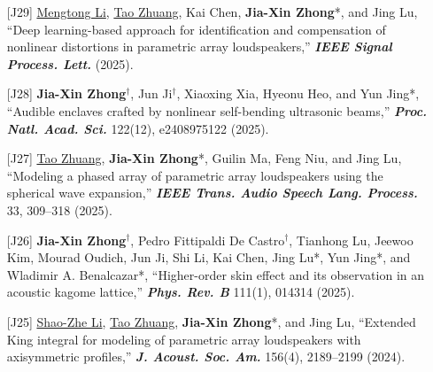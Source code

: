 \documentclass[10pt,a4paper,ragged2e,withhyper]{altacv}
\newcommand{\PubJournal}[1]{\textbf{\textit{#1}}}
\newcommand{\PubTitle}[1]{``{#1,}''}
\newcommand{\PubCorAuthor}[1]{#1*}
\newcommand{\PubMe}[1]{\textbf{#1}}
\let\origaiZenodo\aiZenodo  %
\renewcommand{\aiZenodo}{\raisebox{-0.73ex}{\scalebox{2}{\origaiZenodo}}}
\begin{document}

\begin{itemize}[leftmargin = 30pt]
    \justifying

    \item [{[J29]}]
        \underline{Mengtong Li}, \underline{Tao Zhuang}, Kai Chen, \PubCorAuthor{\PubMe{Jia-Xin Zhong}}, and Jing Lu, 
        \PubTitle{Deep learning-based approach for identification and compensation of nonlinear distortions in parametric array loudspeakers}
        \PubJournal{IEEE Signal Process. Lett.} (2025).
        \href{https://doi.org/10.1109/LSP.2025.3553434}{\color{accent}\aiDoi}
        \href{https://doi.org/10.5281/zenodo.15107800}{\color{accent}\aiZenodo}

    \item[{[J28]}]
    \PubMe{Jia-Xin Zhong}$^\dag$, Jun Ji$^\dag$, Xiaoxing Xia, Hyeonu Heo, and \PubCorAuthor{Yun Jing},
    \PubTitle{Audible enclaves crafted by nonlinear self-bending ultrasonic beams}
    \PubJournal{Proc. Natl. Acad. Sci.} 122(12), e2408975122 (2025).
    \href{https://doi.org/10.1073/pnas.2408975122}{\color{accent}\aiDoi}
    \href{https://doi.org/10.5281/zenodo.14873417}{\color{accent}\aiZenodo}

    \item[{[J27]}]
        \underline{Tao Zhuang}, \PubCorAuthor{\PubMe{Jia-Xin Zhong}}, Guilin Ma, Feng  Niu, and Jing Lu,
    \PubTitle{Modeling a phased array of parametric array loudspeakers using the spherical wave expansion}
    \PubJournal{IEEE Trans. Audio Speech Lang. Process.} 33, 309--318 (2025).
    \href{https://doi.org/10.1109/TASLPRO.2024.3522764}{\color{accent}\aiDoi}
    \item[{[J26]}]
        \PubMe{Jia-Xin Zhong}$^\dag$, Pedro Fittipaldi De Castro$^\dag$, Tianhong Lu, Jeewoo Kim, Mourad Oudich, Jun Ji, Shi Li, Kai Chen, \PubCorAuthor{Jing Lu}, \PubCorAuthor{Yun Jing}, and \PubCorAuthor{Wladimir A. Benalcazar},
        \PubTitle{Higher-order skin effect and its observation in an acoustic kagome lattice}
        \PubJournal{Phys. Rev. B} 111(1), 014314 (2025).
        \href{https://link.aps.org/doi/10.1103/PhysRevB.111.014314}{\color{accent}\aiDoi}
    \item[{[J25]}]
        \underline{Shao-Zhe Li}, \underline{Tao Zhuang}, \PubCorAuthor{\PubMe{Jia-Xin Zhong}}, and Jing Lu,
    \PubTitle{Extended King integral for modeling of parametric array loudspeakers with
    axisymmetric profiles}
    \PubJournal{J. Acoust. Soc. Am.} 156(4), 2189--2199 (2024).
    \href{https://doi.org/10.1121/10.0030403}{\color{accent}\aiDoi}


\end{itemize}
\end{document}
